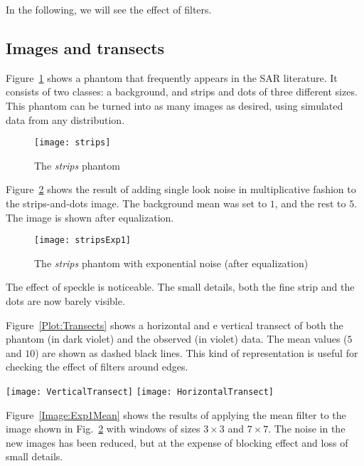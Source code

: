 In the following, we will see the effect of filters.

\subsection{Images and transects}

Figure~\ref{Image:Strips} shows a phantom that frequently appears in the SAR literature\cite{Petty:LAAR:ProtocoloLee}.
It consists of two classes: a background, and strips and dots of three different sizes.
This phantom can be turned into as many images as desired, using simulated data from any distribution.

\begin{figure}[hbt]
\texttt{[image: strips]}
\caption{The \textit{strips} phantom}\label{Image:Strips}
\end{figure}

Figure~\ref{Image:Strips1LookExp} shows the result of adding single look noise in multiplicative fashion to the strips-and-dots image.
The background mean was set to $1$, and the rest to $5$.
The image is shown after equalization.

\begin{figure}[hbt]
	\texttt{[image: stripsExp1]}
	\caption{The \textit{strips} phantom with exponential noise (after equalization)}\label{Image:Strips1LookExp}
\end{figure}

The effect of speckle is noticeable.
The small details, both the fine strip and the dots are now barely visible.

Figure~\ref{Plot:Transects} shows a horizontal and e vertical transect of both the phantom (in dark violet) and the observed (in violet) data.
The mean values ($5$ and $10$) are shown as dashed black lines.
This kind of representation is useful for checking the effect of filters around edges.

\begin{figure*}[hbt]
	\texttt{[image: VerticalTransect]}
	\texttt{[image: HorizontalTransect]}
	\caption{Vertical (left) and horizontal (right) transects}\label{Plot:Transects}
\end{figure*}

Figure~\ref{Image:Exp1Mean} shows the results of applying the mean filter to the image shown in Fig.~\ref{Image:Strips1LookExp} with windows of sizes $3\times3$ and $7\times7$.
The noise in the new images has been reduced, but at the expense of blocking effect and loss of small details.

